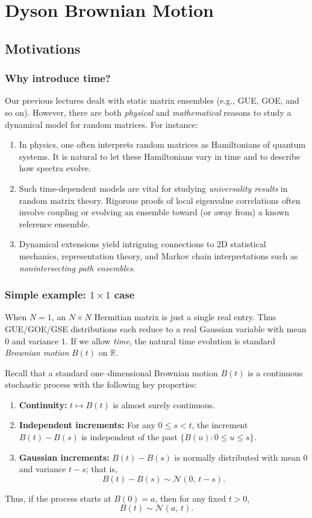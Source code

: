 \documentclass[letterpaper,11pt,oneside,reqno]{book}
\numberwithin{equation}{chapter}  %
\theoremstyle{definition}
\begin{document}
\chapter{Dyson Brownian Motion}
\label{chap:lecture10}






\section{Motivations}
\subsection{Why introduce time?}
Our previous lectures dealt with static matrix ensembles (e.g., GUE, GOE, and so on). However, there are both \emph{physical} and \emph{mathematical} reasons to study a dynamical model for random matrices. For instance:
\begin{enumerate}
\item In physics, one often interprets random matrices as Hamiltonians of quantum systems. It is natural to let these Hamiltonians vary in time and to describe how spectra evolve.
\item Such time-dependent models are vital for studying \emph{universality results} in random matrix theory. Rigorous proofs of local eigenvalue correlations often involve coupling or evolving an ensemble toward (or away from) a known reference ensemble.
\item Dynamical extensions yield intriguing connections to 2D statistical mechanics, representation theory, and Markov chain interpretations such as \emph{nonintersecting path ensembles}.
\end{enumerate}

\subsection{Simple example: \texorpdfstring{$1\times1$}{1 x 1} case}
When $N=1$, an $N\times N$ Hermitian matrix is just a single real entry. Thus GUE/GOE/GSE distributions each reduce to a real Gaussian variable with mean $0$ and variance $1$. If we allow \emph{time}, the natural time evolution is standard \emph{Brownian motion} $B(t)$ on $\mathbb{R}$.

Recall that a standard one--dimensional Brownian motion \(B(t)\) is a continuous stochastic process with the following key properties:
\begin{enumerate}
    \item \textbf{Continuity:} \(t\mapsto B(t)\) is almost surely continuous.
    \item \textbf{Independent increments:} For any \(0\leq s < t\), the increment \(B(t)-B(s)\) is independent of the past \(\{B(u): 0\le u \le s\}\).
    \item \textbf{Gaussian increments:} \(B(t)-B(s)\) is normally distributed with mean \(0\) and variance \(t-s\); that is,
    \[
    B(t)-B(s) \sim \mathcal{N}(0,\,t-s).
    \]
\end{enumerate}
Thus, if the process starts at \(B(0)=a\), then for any fixed \(t>0\),
\[
B(t)\sim \mathcal{N}(a,\,t).
\]
\end{document}
